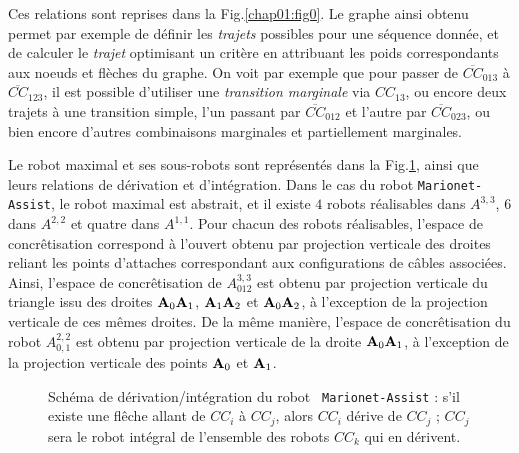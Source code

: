 Ces relations sont reprises dans la Fig.\ref{chap01:fig0}. Le graphe ainsi 
obtenu permet par exemple de d\'efinir les {\it trajets} possibles pour une 
s\'equence donn\'ee, et de calculer le {\it trajet} optimisant un crit\`ere en 
attribuant les poids correspondants aux noeuds et fl\`eches du graphe. On voit 
par exemple que pour passer de $\overline{CC}_{013}$ \`a $\overline{CC}_{123}$, 
il est possible d'utiliser une {\it transition marginale} via $CC_{13}$, ou 
encore deux trajets \`a une transition simple, l'un passant par 
$\overline{CC}_{012}$ et l'autre par $\overline{CC}_{023}$, ou bien encore 
d'autres combinaisons marginales et partiellement marginales.

Le robot maximal et ses sous-robots sont repr\'esent\'es dans la 
Fig.\ref{chap01:fig1}, ainsi que leurs relations de d\'erivation et 
d'int\'egration. Dans le cas du robot {\tt Marionet-Assist}, le robot maximal 
est abstrait, et il existe $4$ robots r\'ealisables dans $A^{3,3}$, $6$ dans 
$A^{2,2}$ et quatre dans $A^{1,1}$. Pour chacun des robots r\'ealisables, 
l'espace de concr\^etisation correspond \`a l'ouvert obtenu par projection 
verticale des droites reliant les points d'attaches correspondant aux 
configurations de c\^ables associ\'ees. Ainsi, l'espace de concr\^etisation de 
$A^{3,3}_{012}$ est obtenu par projection verticale du triangle issu des 
droites ${\bf A}_0{\bf A}_1$, ${\bf A}_1{\bf A}_2$ et ${\bf A}_0{\bf A}_2$, \`a 
l'exception de la projection verticale de ces m\^emes droites. De la m\^eme 
mani\`ere, l'espace de concr\^etisation du robot $A^{2,2}_{0,1}$ est obtenu par 
projection verticale de la droite ${\bf A}_0{\bf A}_1$, \`a l'exception de la 
projection verticale des points ${\bf A}_0$ et ${\bf A}_1$.

\begin{figure}[htp]
  \centering
    \def\svgwidth{.65\linewidth}
  
    \caption{\footnotesize{Schéma de d\'erivation/int\'egration du robot {\tt 
Marionet-Assist} : s'il existe une fl\^eche allant de $CC_i$ \`a $CC_j$, 
alors $CC_i$ d\'erive de $CC_j$ ; $CC_j$ sera le robot int\'egral de l'ensemble 
des robots $CC_k$ qui en d\'erivent.}}
\label{chap01:fig1}
\end{figure}

